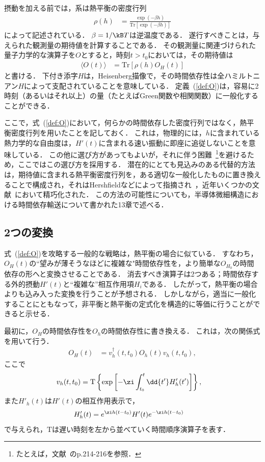 \documentclass[a4paper,10pt]{jsarticle}
\begin{document}
摂動を加える前では，系は熱平衡の密度行列
\begin{align}
\rho (h)
	& = \frac{ \exp( - \beta h) }{ \mathrm{Tr}[ \exp(- \beta h) ] }
\end{align}
によって記述されている．
$\beta = 1 / \kB T$は逆温度である．
遂行すべきことは，与えられた観測量の期待値を計算することである．
その観測量に関連づけられた量子力学的な演算子を$O$とすると，時刻$t > t_0$においては，その期待値は
\begin{align}
\langle O (t) \rangle
	& = \mathrm{Tr} [ \rho (h) O_{H} (t) ]
\label{def:O}
\end{align}
と書ける．
下付き添字$H$は，Heisenberg描像で，その時間依存性は全ハミルトニアン$H$によって支配されていることを意味している．
定義~(\ref{def:O})は，容易に2時刻（あるいはそれ以上）の量（たとえばGreen関数や相関関数）に一般化することができる．

ここで，式~(\ref{def:O})において，何らかの時間依存した密度行列ではなく，熱平衡密度行列を用いたことを記しておく．
これは，物理的には，$h$に含まれている熱力学的な自由度は，$H'(t)$に含まれる速い振動に即座に追従しないことを意味している．
この他に選び方があってもよいが，それに伴う困難~\footnote{たとえば，文献~\cite{Mahan}のp.214-216を参照．}を避けるため，ここではこの選び方を採用する．
潜在的にとても見込みのある代替的方法は，期待値に含まれる熱平衡密度行列を，ある適切な一般化したものに置き換えることで構成され，それはHershfieldなどによって指摘され~\cite{Hershfield}，近年いくつかの文献~\cite{Bokes,Coleman,Doyon,Han}において精巧化された．
この方法の可能性についても，半導体微細構造における時間依存輸送について書かれた13章で述べる．

\subsection{\label{sec:4.2}2つの変換}
式~(\ref{def:O})を攻略する一般的な戦略は，熱平衡の場合に似ている．
すなわち，$O_H (t)$の``望みが薄そうなほどに複雑な"時間依存性を，より簡単な$O_{H_0}$の時間依存の形へと変換させることである．
消去すべき演算子は2つある；時間依存する外的摂動$H' (t)$と``複雑な''相互作用項$H_i$である．
したがって，熱平衡の場合よりも込み入った変換を行うことが予想される．
しかしながら，適当に一般化することにともなって，非平衡と熱平衡の定式化を構造的に等価に行うことができると示せる．

最初に，$O_H$の時間依存性を$O_h$の時間依存性に書き換える．
これは，次の関係式を用いて行う．
\begin{align}
O_H (t)
	& = v_h^{\dagger} (t, t_0) O_h (t) v_h (t, t_0)
\label{eq:O_H}
,\end{align}
ここで
\begin{align}
v_h (t, t_0)
	& = \mathrm{T} \left\{ \exp \left[ - \zi \int_{t_0}^{t} \dd{t'} H'_h (t') \right] \right\}
,\end{align}
また$H'_h (t)$は$H' (t)$の相互作用表示で，
\begin{align}
H'_h (t)
	& = e^{\zi h (t - t_0)} H' (t) e^{- \zi h (t - t_0)}
\end{align}
で与えられ，$\mathrm{T}$は遅い時刻を左から並べていく時間順序演算子を表す．
\end{document}
